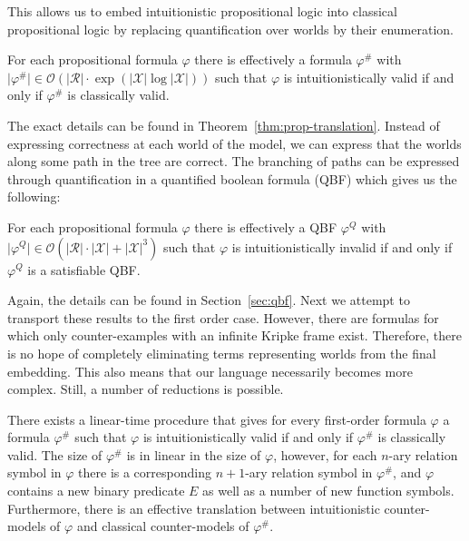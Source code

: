 \documentclass[runningheads]{llncs}
\begin{document}
This allows us to embed intuitionistic propositional logic into classical propositional logic by replacing quantification over worlds by their enumeration.

\begin{lemma}
	For each propositional formula $\varphi$ there is effectively a formula $\varphi^\#$ with $\mathcal |\varphi^\#|\in\mathcal O(|\mathcal R|\cdot\exp(|\mathcal X|\log|\mathcal X|))$ such that $\varphi$ is intuitionistically valid if and only if $\varphi^\#$ is classically valid.
\end{lemma}

The exact details can be found in Theorem~\ref{thm:prop-translation}. Instead of expressing correctness at each world of the model, we can express that the worlds along some path in the tree are correct. The branching of paths can be expressed through quantification in a quantified boolean formula (QBF) which gives us the following:

\begin{lemma}
	For each propositional formula $\varphi$ there is effectively a QBF $\varphi^Q$ with $\mathcal |\varphi^Q|\in\mathcal O(|\mathcal R|\cdot|\mathcal X| + |\mathcal X|^3)$ such that $\varphi$ is intuitionistically invalid if and only if $\varphi^Q$ is a satisfiable QBF.
\end{lemma}

Again, the details can be found in Section~\ref{sec:qbf}. Next we attempt to transport these results to the first order case. However, there are formulas for which only counter-examples with an infinite Kripke frame exist. Therefore, there is no hope of completely eliminating terms representing worlds from the final embedding. This also means that our language necessarily becomes more complex. Still, a number of reductions is possible.

\begin{theorem}
	\label{thm:reduction-first-order-short}
	There exists a linear-time procedure that gives for every first-order formula $\varphi$ a formula $\varphi^\#$ such that $\varphi$ is intuitionistically valid if and only if $\varphi^\#$ is classically valid. The size of $\varphi^\#$ is in linear in the size of $\varphi$, however, for each $n$-ary relation symbol in $\varphi$ there is a corresponding $n+1$-ary relation symbol in $\varphi^\#$, and $\varphi$ contains a new binary predicate $E$ as well as a number of new function symbols. Furthermore, there is an effective translation between intuitionistic counter-models of $\varphi$ and classical counter-models of $\varphi^\#$.
\end{theorem}
\end{document}
